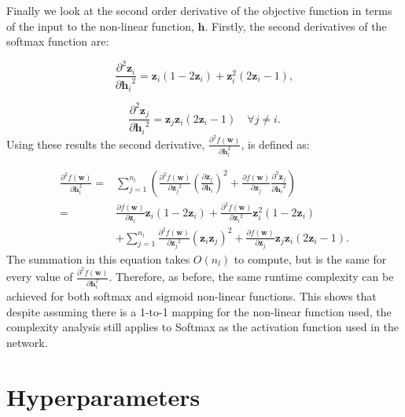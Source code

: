 \documentclass[letterpaper,12pt,titlepage,oneside,final]{book}
\begin{document}
	Finally we look at the second order derivative of the objective function in terms of the input to the non-linear function, $\mathbf{h}$. Firstly, the second derivatives of the softmax function are:
	
	\begin{equation}
	\frac{\partial^{2}{\mathbf{z}_{i}}}{\partial{\mathbf{h}_{i}}^{2}} = \mathbf{z}_{i}(1 - 2\mathbf{z}_{i}) + \mathbf{z}_{i}^2(2\mathbf{z}_{i} - 1) ,
	\end{equation}
	
	\begin{equation}
	\frac{\partial^{2}{\mathbf{z}_{j}}}{\partial{\mathbf{h}_{i}}^{2}} = \mathbf{z}_{j}\mathbf{z}_{i}(2\mathbf{z}_{i}-1) \quad \forall j \neq i.
	\end{equation}
	Using these results the second derivative, $\frac{\partial^{2}{f(\mathbf{w})}}{\partial{\mathbf{h}_{i}^{2}}}$, is defined as:
	
	\begin{equation}
	\begin{split}
	\frac{\partial^{2}{f(\mathbf{w})}}{\partial{\mathbf{h}_{i}^{2}}} = &\sum_{j = 1}^{n_{l}}({\frac{\partial^{2}{f(\mathbf{w})}}{\partial{\mathbf{z}_{j}}^{2}}(\frac{\partial{\mathbf{z}_{j}}}{\partial{\mathbf{h}_{i}}})^{2} +\frac{\partial{f(\mathbf{w})}}{\partial{\mathbf{z}_{j}}}\frac{\partial^{2}{\mathbf{z}_{j}}}{\partial{\mathbf{h}_{i}}^{2}}}) \\ = & \frac{\partial{f(\mathbf{w})}}{\partial{\mathbf{z}_{i}}}\mathbf{z}_{i}(1 - 2\mathbf{z}_{i})+\frac{\partial^{2}{f(\mathbf{w})}}{\partial{\mathbf{z}_{i}}^{2}}\mathbf{z}_{i}^{2}(1-2\mathbf{z}_{i})\\ &  + \sum_{j = 1}^{n_{l}}{\frac{\partial^{2}{f(\mathbf{w})}}{\partial{\mathbf{z}_{j}}^{2}}(\mathbf{z}_{i}\mathbf{z}_{j})^{2}} +\frac{\partial{f(\mathbf{w})}}{\partial{\mathbf{z}_{j}}}\mathbf{z}_{j}\mathbf{z}_{i}(2\mathbf{z}_{i}-1).
	\end{split}
	\end{equation}
	The summation in this equation takes $O(n_{l})$ to compute, but is the same for every value of $\frac{\partial^{2}{f(\mathbf{w})}}{\partial{\mathbf{h}_{i}^{2}}}$. Therefore, as before, the same runtime complexity can be achieved for both softmax and sigmoid non-linear functions. This shows that despite assuming there is a 1-to-1 mapping for the non-linear function used, the complexity analysis still applies to Softmax as the activation function used in the network.
	
	\chapter{Hyperparameters}
	\label{appendix:hyperparameters}
	
\end{document}
